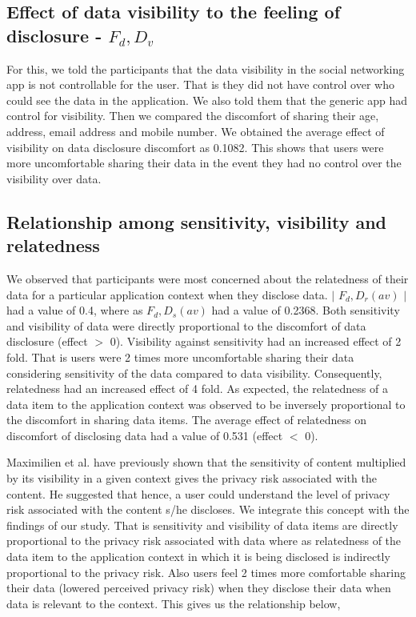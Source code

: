 \documentclass[conference]{IEEEtran}
\begin{document}
\subsection{Effect of data visibility to the feeling of disclosure -  $F_d,D_v$}

For this, we told the participants that the data visibility in the social networking app is not controllable for the user. That is they did not have control over who could see the data in the application. We also told them that the generic app had control for visibility. Then we compared the discomfort of sharing their age, address, email address and mobile number. We obtained the average effect of visibility on data disclosure discomfort as 0.1082. This shows that users were more uncomfortable sharing their data in the event they had no control over the visibility over data. 

\subsection {Relationship among sensitivity, visibility and relatedness}
We observed that participants were most concerned about the relatedness of their data for a particular application context when they disclose data. $\mid$ $F_d,D_r(av)$ $\mid$ had a value of 0.4, where as $F_d,D_s(av)$ had a value of 0.2368. Both sensitivity and visibility of data were directly proportional to the discomfort of data disclosure (effect $>$ 0). Visibility against sensitivity had an increased effect of 2 fold. That is users were 2 times more uncomfortable sharing their data considering sensitivity of the data compared to data visibility. Consequently, relatedness had an increased effect of 4 fold. As expected, the relatedness of a data item to the application context was observed to be inversely proportional to the discomfort in sharing data items. The average effect of relatedness on discomfort of disclosing data had a value of 0.531 (effect $<$ 0).

Maximilien et al. \cite {maximilien2009privacy} have previously shown that the sensitivity of content multiplied by its visibility in a given context gives the privacy risk associated with the content. He suggested that hence, a user could understand the level of privacy risk associated with the content s/he discloses. We integrate this concept with the findings of our study. That is sensitivity and visibility of data items are directly proportional to the privacy risk associated with data where as relatedness of the data item to the application context in which it is being disclosed is indirectly proportional to the privacy risk. Also users feel 2 times more comfortable sharing their data (lowered perceived privacy risk) when they disclose their data when data is relevant to the context. This gives us the relationship below,
\end{document}
